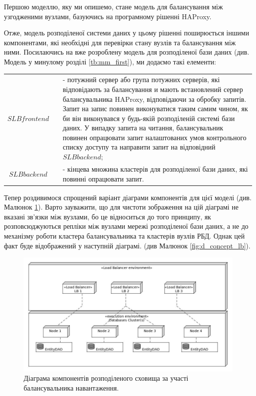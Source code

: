 \documentclass[14pt]{vakthesis}
\begin{document}
Першою моделлю, яку ми опишемо, стане модель для балансування між узгодженими вузлами, базуючись на програмному рішенні HAProxy.

Отже, модель розподіленої системи даних у цьому рішенні поширюється іншими компонентами, які необхідні для перевірки стану вузлів та балансування між ними.
Посилаючись на вже розроблену модель для розподіленої бази даних (див. Модель у минулому розділі \ref{tb:mm_first}), ми додаємо такі елементи:

\begin{tabular*}{\textwidth}{cp{0.5cm}p{}}\label{tb:mm_second}
$SLB frontend$&& - потужний сервер або група потужних серверів, які відповідають за балансування и мають встановлений сервер балансувальника HAProxy, відповідаючи за обробку запитів. Запит на запис повинен виконуватися таким самим чином, як би він виконувався у будь-якій розподіленій системі бази даних. У випадку запита на читання, балансувальник повинен опрацювати запит налаштованих умов контрольного списку доступу та направити запит на відповідний $SLB backend$;\\
$SLB backend$&& - кінцева множина кластерів для розподіленої бази даних, які повинні опрацювати запит.

\end{tabular*}

Тепер роздивимося спрощений варіант діаграми компонентів для цієї моделі (див. Малюнок \ref{fig:d_components_lb}). Варто зауважити, що для чистоти зображення на цій діаграмі не вказані зв'язки між вузлами, бо це відноситься до того принципу, як розповсюджуються репліки між вузлами мережі розподіленої бази даних, а не до механізму роботи кластера балансувальника та кластерів вузлів РБД. Однак цей факт буде відображений у наступній діаграмі. (див Малюнок \ref{fig:d_concept_lb}). 

\begin{figure}
\centering

\includegraphics[width=\linewidth]{images/d_components_lb.jpg}
     \caption{Діаграма 	компонентів розподіленого сховища за участі балансувальника навантаження.}
     \label{fig:d_components_lb}
\end{figure}
\end{document}
